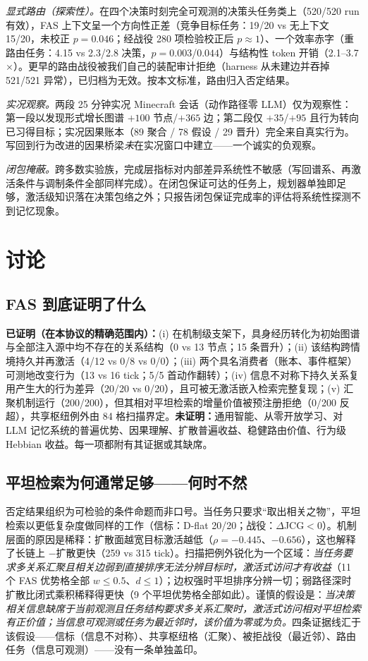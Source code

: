 \documentclass[10pt,a4paper]{ctexart}
\begin{document}
\emph{显式路由（探索性）。}在四个决策时刻完全可观测的决策头任务类上（520/520 run 有效），FAS 上下文呈一个方向性正差（竞争目标任务：19/20 vs 无上下文 15/20，未校正 $p{=}0.046$；经战役 280 项检验校正后 $p{\approx}1$）、一个效率赤字（重路由任务：4.15 vs 2.3/2.8 决策，$p{=}0.003$/$0.044$）与结构性 token 开销（2.1--3.7$\times$）。更早的路由战役被我们自己的装配审计拒绝（harness 从未建边并吞掉 521/521 异常），已归档为无效。按本文标准，路由归入否定结果。

\emph{实况观察。}两段 25 分钟实况 Minecraft 会话（动作路径零 LLM）仅为观察性：第一段以发现形式增长图谱 $+100$ 节点/$+365$ 边；第二段仅 $+35$/$+95$ 且行为转向已习得目标；实况因果账本（89 聚合 / 78 假设 / 29 晋升）完全来自真实行为。写回到行为改进的因果桥梁\emph{未}在实况窗口中建立——一个诚实的负观察。

\emph{闭包掩蔽。}跨多数实验族，完成层指标对内部差异系统性不敏感（写回谱系、再激活条件与调制条件全部同样完成）。在闭包保证可达的任务上，规划器单独即足够，激活级知识落在决策包络之外；只报告闭包保证完成率的评估将系统性探测不到记忆现象。

\section{讨论}
\label{sec:discussion}

\subsection{FAS 到底证明了什么}
\textbf{已证明（在本协议的精确范围内）：}(i) 在机制级支架下，具身经历转化为初始图谱与全部注入源中均不存在的关系结构（0 vs 13 节点；15 条晋升）；(ii) 该结构跨情境持久并再激活（4/12 vs 0/8 vs 0/0）；(iii) 两个具名消费者（账本、事件框架）可测地改变行为（13 vs 16 tick；5/5 首动作翻转）；(iv) 信息不对称下持久关系复用产生大的行为差异（20/20 vs 0/20），且可被无激活嵌入检索完整复现；(v) 汇聚机制运行（200/200），但其相对平坦检索的增量价值被预注册拒绝（0/200 反超），共享枢纽例外由 84 格扫描界定。\textbf{未证明：}通用智能、从零开放学习、对 LLM 记忆系统的普遍优势、因果理解、扩散普遍收益、稳健路由价值、行为级 Hebbian 收益。每一项都附有其证据或其缺席。

\subsection{平坦检索为何通常足够——何时不然}
否定结果组织为可检验的条件命题而非口号。当任务只要求“取出相关之物”，平坦检索以更低复杂度做同样的工作（信标：D-flat 20/20；战役：$\Delta$JCG${<}0$）。机制层面的原因是稀释：扩散面越宽目标激活越低（$\rho{=}{-}0.445$、${-}0.656$），这也解释了长链上 $-$扩散更快（259 vs 315 tick）。扫描把例外锐化为一个区域：\emph{当任务要求多关系汇聚且相关边弱到直接排序无法分辨目标时，激活式访问才有收益}（11 个 FAS 优势格全部 $w{\le}0.5$、$d{\le}1$）；边权强时平坦排序分辨一切；弱路径深时扩散比闭式乘积稀释得更快（9 个平坦优势格全部如此）。谨慎的假设是：\emph{当决策相关信息缺席于当前观测且任务结构要求多关系汇聚时，激活式访问相对平坦检索有正价值；当信息可观测或任务为最近邻时，该价值为零或为负。}四条证据线汇于该假设——信标（信息不对称）、共享枢纽格（汇聚）、被拒战役（最近邻）、路由任务（信息可观测）——没有一条单独盖印。
\end{document}
